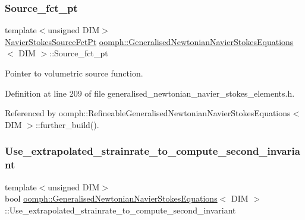 \subsubsection{\texorpdfstring{Source\+\_\+fct\+\_\+pt}{Source\_fct\_pt}}
{\footnotesize\ttfamily template$<$unsigned D\+IM$>$ \\
\hyperlink{classoomph_1_1GeneralisedNewtonianNavierStokesEquations_a817ff3b87362e53bf1d0594723b84573}{Navier\+Stokes\+Source\+Fct\+Pt} \hyperlink{classoomph_1_1GeneralisedNewtonianNavierStokesEquations}{oomph\+::\+Generalised\+Newtonian\+Navier\+Stokes\+Equations}$<$ D\+IM $>$\+::Source\+\_\+fct\+\_\+pt\hspace{0.3cm}{\ttfamily [protected]}}



Pointer to volumetric source function. 



Definition at line 209 of file generalised\+\_\+newtonian\+\_\+navier\+\_\+stokes\+\_\+elements.\+h.



Referenced by oomph\+::\+Refineable\+Generalised\+Newtonian\+Navier\+Stokes\+Equations$<$ D\+I\+M $>$\+::further\+\_\+build().

\mbox{\label{classoomph_1_1GeneralisedNewtonianNavierStokesEquations_a175556b0060e4b74b851798556243a9e}} 
\subsubsection{\texorpdfstring{Use\+\_\+extrapolated\+\_\+strainrate\+\_\+to\+\_\+compute\+\_\+second\+\_\+invariant}{Use\_extrapolated\_strainrate\_to\_compute\_second\_invariant}}
{\footnotesize\ttfamily template$<$unsigned D\+IM$>$ \\
bool \hyperlink{classoomph_1_1GeneralisedNewtonianNavierStokesEquations}{oomph\+::\+Generalised\+Newtonian\+Navier\+Stokes\+Equations}$<$ D\+IM $>$\+::Use\+\_\+extrapolated\+\_\+strainrate\+\_\+to\+\_\+compute\+\_\+second\+\_\+invariant\hspace{0.3cm}{\ttfamily [protected]}}



